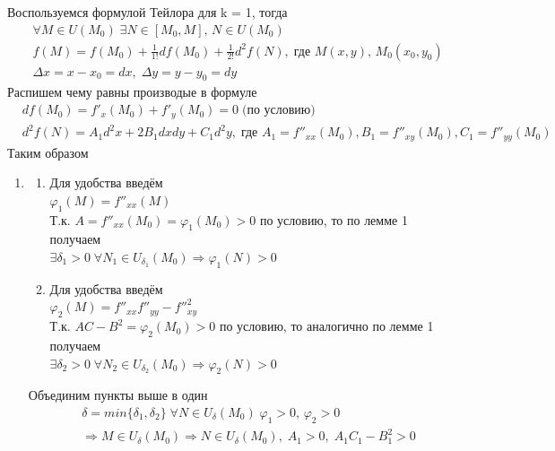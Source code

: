     \begin{Proof}
        Воспользуемся формулой Тейлора для k = 1, тогда
        \begin{align*}
        &\forall M \in U(M_0) \; \exists N \in [M_0, M], \, N \in U(M_0)\\
        &f(M) = f(M_0) + \frac{1}{1!} df(M_0) + \frac{1}{2!} d^2f(N), \; \text{где } M(x, y), \, M_0(x_0, y_0)\\
        &\Delta x = x - x_0 = dx, \; \Delta y = y - y_0 = dy
        \end{align*}
        Распишем чему равны производые в формуле
        \begin{align*}
        &df(M_0) = f'_x(M_0) + f'_y(M_0) = 0 \; \text{(по условию)}\\
        &d^2f(N) = A_1 d^2x + 2 B_1 dx dy + C_1 d^2y, \; \text{где } A_1 = f''_{xx}(M_0), B_1 = f''_{xy}(M_0), C_1 = f''_{yy}(M_0)
        \end{align*}
        Таким образом 
        \begin{enumerate}
            \item \begin{enumerate} 
            \item Для удобства введём\\
            $\varphi_1(M) = f''_{xx}(M)$\\
            Т.к. $A = f''_{xx}(M_0) = \varphi_1(M_0) > 0$ по условию, то по лемме 1 получаем\\
            $\exists \delta_1 > 0 \; \forall N_1 \in U_{\delta_1}(M_0) \Rightarrow \varphi_1(N) > 0$
            \item Для удобства введём\\
            $\varphi_2(M) = f''_{xx}f''_{yy} - f''^2_{xy}$\\
            Т.к. $AC - B^2 = \varphi_2(M_0) > 0$ по условию, то аналогично по лемме 1 получаем\\
            $\exists \delta_2 > 0 \; \forall N_2 \in U_{\delta_2}(M_0) \Rightarrow \varphi_2(N) > 0$
            \end{enumerate}
            Объединим пункты выше в один
            \begin{align*}
                &\delta = min\{\delta_1, \delta_2\} \; \forall N \in U_\delta(M_0) \; \varphi_1 > 0, \, \varphi_2 > 0\\
                &\Rightarrow M \in U_\delta(M_0) \Rightarrow N \in U_\delta(M_0), \; A_1 > 0, \; A_1C_1 - B_1^2 > 0
            \end{align*}

\end{enumerate}
\end{Proof}
